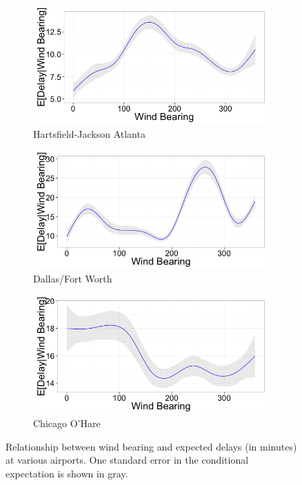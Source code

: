 \documentclass{article}
\begin{document}
\begin{figure}
\centering
\begin{subfigure}{0.45\textwidth}
    \centering
    \includegraphics[width=\linewidth]{figures/windBearing-ATL.png}
    \caption{Hartsfield-Jackson Atlanta}
\end{subfigure}
\begin{subfigure}{0.45\textwidth}
    \centering
    \includegraphics[width=\linewidth]{figures/windBearing-DFW.png}
    \caption{Dallas/Fort Worth}
\end{subfigure}
\begin{subfigure}{0.45\textwidth}
    \centering
    \includegraphics[width=\linewidth]{figures/windBearing-ORD.png}
    \caption{Chicago O'Hare}
\end{subfigure}
\caption{Relationship between wind bearing and expected delays (in minutes) at various airports. One standard error in the conditional expectation is shown in gray.} 
\label{fig:wind-bearing-feature}
\end{figure}
\end{document}
